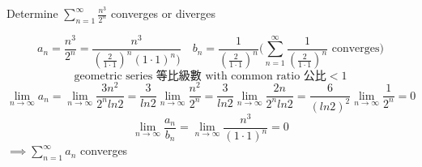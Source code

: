 \begin{eg}
Determine \(\displaystyle \sum^{\infty}_{n = 1} \frac{n^3}{2^n}\) converges or diverges

\soln
\[\displaystyle a_n  = \frac{n^3}{2^n} = \frac{n^3}{(\frac{2}{1 \cdot 1})^n (1 \cdot 1)^n)} \quad b_n = \frac{1}{(\frac{2}{1 \cdot 1})^n} (\sum^{\infty}_{n = 1} \frac{1}{(\frac{2}{1 \cdot 1})^n} \text{ converges)}\] 
\[\text{geometric series 等比級數 with common ratio 公比} < 1\]
\[\displaystyle \lim_{n \to \infty} a_n = \lim_{n \to \infty} \frac{3n^2}{2^n ln2} = \frac{3}{ln2} \lim_{n \to \infty} \frac{n^2}{2^n} = \frac{3}{ln2} \lim_{n \to \infty} \frac{2n}{2^n ln2} = \frac{6}{(ln2)^2} \lim_{n \to \infty} \frac{1}{2^n} = 0\]
\[\displaystyle \lim_{n \to \infty} \frac{a_n}{b_n} = \lim_{n \to \infty} \frac{n^3}{(1 \cdot 1)^n} = 0\]
\(\implies \displaystyle \sum^{\infty}_{n = 1} a_n\) converges
\end{eg}
